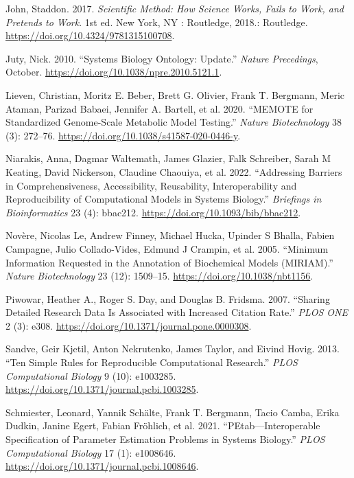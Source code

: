 \documentclass[
  a4paper,
]{scrartcl}
\newlength{\cslhangindent}
\newenvironment{CSLReferences}[2] %
 {\begin{list}{}{%
  \setlength{\itemindent}{0pt}
  \setlength{\leftmargin}{0pt}
  \setlength{\parsep}{0pt}
  \ifodd #1
   \setlength{\leftmargin}{\cslhangindent}
   \setlength{\itemindent}{-1\cslhangindent}
  \fi
  \setlength{\itemsep}{#2\baselineskip}}}
 {\end{list}}
\begin{document}
\begin{CSLReferences}{1}{0}
John, Staddon. 2017. \emph{Scientific {Method}: {How} {Science} {Works},
{Fails} to {Work}, and {Pretends} to {Work}}. 1st ed. New York, NY :
Routledge, 2018.: Routledge.
\url{https://doi.org/10.4324/9781315100708}.

Juty, Nick. 2010. {``Systems {Biology} {Ontology}: {Update}.''}
\emph{Nature Precedings}, October.
\url{https://doi.org/10.1038/npre.2010.5121.1}.

Lieven, Christian, Moritz E. Beber, Brett G. Olivier, Frank T. Bergmann,
Meric Ataman, Parizad Babaei, Jennifer A. Bartell, et al. 2020.
{``{MEMOTE} for Standardized Genome-Scale Metabolic Model Testing.''}
\emph{Nature Biotechnology} 38 (3): 272--76.
\url{https://doi.org/10.1038/s41587-020-0446-y}.

Niarakis, Anna, Dagmar Waltemath, James Glazier, Falk Schreiber, Sarah M
Keating, David Nickerson, Claudine Chaouiya, et al. 2022. {``Addressing
Barriers in Comprehensiveness, Accessibility, Reusability,
Interoperability and Reproducibility of Computational Models in Systems
Biology.''} \emph{Briefings in Bioinformatics} 23 (4): bbac212.
\url{https://doi.org/10.1093/bib/bbac212}.

Novère, Nicolas Le, Andrew Finney, Michael Hucka, Upinder S Bhalla,
Fabien Campagne, Julio Collado-Vides, Edmund J Crampin, et al. 2005.
{``Minimum Information Requested in the Annotation of Biochemical Models
({MIRIAM}).''} \emph{Nature Biotechnology} 23 (12): 1509--15.
\url{https://doi.org/10.1038/nbt1156}.

Piwowar, Heather A., Roger S. Day, and Douglas B. Fridsma. 2007.
{``Sharing {Detailed} {Research} {Data} {Is} {Associated} with
{Increased} {Citation} {Rate}.''} \emph{PLOS ONE} 2 (3): e308.
\url{https://doi.org/10.1371/journal.pone.0000308}.

Sandve, Geir Kjetil, Anton Nekrutenko, James Taylor, and Eivind Hovig.
2013. {``Ten {Simple} {Rules} for {Reproducible} {Computational}
{Research}.''} \emph{PLOS Computational Biology} 9 (10): e1003285.
\url{https://doi.org/10.1371/journal.pcbi.1003285}.

Schmiester, Leonard, Yannik Schälte, Frank T. Bergmann, Tacio Camba,
Erika Dudkin, Janine Egert, Fabian Fröhlich, et al. 2021.
{``{PEtab}---{Interoperable} Specification of Parameter Estimation
Problems in Systems Biology.''} \emph{PLOS Computational Biology} 17
(1): e1008646. \url{https://doi.org/10.1371/journal.pcbi.1008646}.


\end{CSLReferences}
\end{document}

